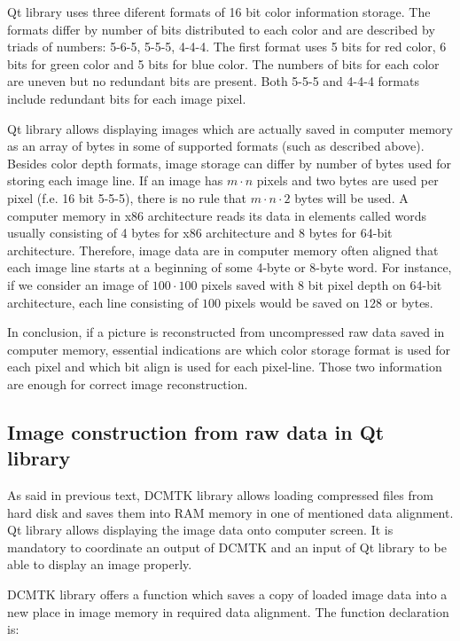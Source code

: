 Qt library uses three diferent formats of 16 bit color information storage. The formats differ by number of bits distributed to each color and are described by triads of numbers: 5-6-5, 5-5-5, 4-4-4. The first format uses 5 bits for red color, 6 bits for green color and 5 bits for blue color. The numbers of bits for each color are uneven but no redundant bits are present. Both 5-5-5 and 4-4-4 formats include redundant bits for each image pixel.

Qt library allows displaying images which are actually saved in computer memory as an array of bytes in some of supported formats (such as described above). Besides color depth formats, image storage can differ by number of bytes used for storing each image line. If an image has $m \cdot n$ pixels and two bytes are used per pixel (f.e. 16 bit 5-5-5), there is no rule that $m \cdot n \cdot 2$ bytes will be used. A computer memory in x86 architecture reads its data in elements called words usually consisting of 4 bytes for x86 architecture and 8 bytes for 64-bit architecture. Therefore, image data are in computer memory often aligned that each image line starts at a beginning of some 4-byte or 8-byte word. For instance, if we consider an image of $100 \cdot 100$ pixels saved with 8 bit pixel depth on 64-bit architecture, each line consisting of $100$ pixels would be saved on $128$ or bytes.

In conclusion, if a picture is reconstructed from uncompressed raw data saved in computer memory, essential indications are which color storage format is used for each pixel and which bit align is used for each pixel-line. Those two information are enough for correct image reconstruction.

\subsection{Image construction from raw data in Qt library}
As said in previous text, DCMTK library allows loading compressed files from hard disk and saves them into RAM memory in one of mentioned data alignment. Qt library allows displaying the image data onto computer screen. It is mandatory to coordinate an output of DCMTK and an input of Qt library to be able to display an image properly.

DCMTK library offers a function which saves a copy of loaded image data into a new place in image memory in required data alignment. The function declaration is:



